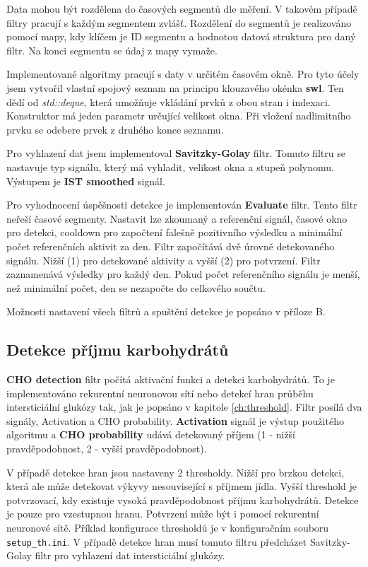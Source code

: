 Data mohou být rozdělena do časových segmentů dle měření. V takovém případě filtry pracují s každým segmentem zvlášť. Rozdělení do segmentů je realizováno pomocí mapy, kdy klíčem je ID segmentu a hodnotou datová struktura pro daný filtr. Na konci segmentu se údaj z mapy vymaže.

Implementované algoritmy pracují s daty v určitém časovém okně. Pro tyto účely jsem vytvořil vlastní spojový seznam na principu klouzavého okénka \textbf{swl}. Ten dědí od \textit{std::deque}, která umožňuje vkládání prvků z obou stran i indexaci. Konstruktor má jeden parametr určující velikost okna. Při vložení nadlimitního prvku se odebere prvek z druhého konce seznamu.

Pro vyhlazení dat jsem implementoval \textbf{Savitzky-Golay} filtr. Tomuto filtru se nastavuje typ signálu, který má vyhladit, velikost okna a stupeň polynomu. Výstupem je \textbf{IST smoothed} signál.

Pro vyhodnocení úspěšnosti detekce je implementován \textbf{Evaluate} filtr. Tento filtr neřeší časové segmenty. Nastavit lze zkoumaný a referenční signál, časové okno pro detekci, cooldown pro započtení falešně pozitivního výsledku a minimální počet referenčních aktivit za den. Filtr započítává dvě úrovně detekovaného signálu. Nižší (1) pro detekované aktivity a vyšší (2) pro potvrzení. Filtr zaznamenává výsledky pro každý den. Pokud počet referenčního signálu je menší, než minimální počet, den se nezapočte do celkového součtu.

Možnosti nastavení všech filtrů a spuštění detekce je popsáno v příloze B.


\subsection{Detekce příjmu karbohydrátů}

\textbf{CHO detection} filtr počítá aktivační funkci a detekci karbohydrátů. To je implementováno rekurentní neuronovou sítí nebo detekcí hran průběhu intersticiální glukózy tak, jak je popsáno v kapitole \ref{ch:threshold}. Filtr posílá dva signály, Activation a CHO probability. \textbf{Activation} signál je výstup použitého algoritmu a \textbf{CHO probability} udává detekovaný příjem (1 - nižší pravděpodobnost, 2 - vyšší pravděpodobnost).

V případě detekce hran jsou nastaveny 2 thresholdy. Nižší pro brzkou detekci, která ale může detekovat výkyvy nesouvisející s příjmem jídla. Vyšší threshold je potvrzovací, kdy existuje vysoká pravděpodobnost příjmu karbohydrátů. Detekce je pouze pro vzestupnou hranu. Potvrzení může být i pomocí rekurentní neuronové sítě. Příklad konfigurace thresholdů je v konfiguračním souboru \texttt{setup\_th.ini}. V případě detekce hran musí tomuto filtru předcházet Savitzky-Golay filtr pro vyhlazení dat intersticiální glukózy.


